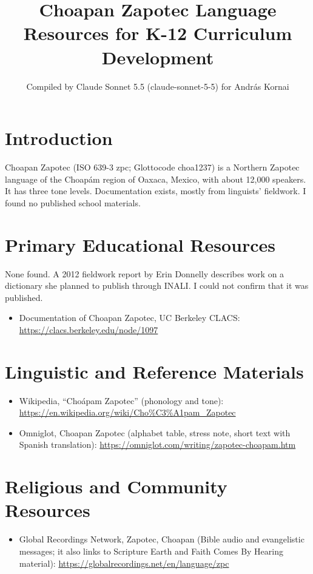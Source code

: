 \documentclass[12pt]{article}
\title{Choapan Zapotec Language Resources for K-12 Curriculum Development}
\author{Compiled by Claude Sonnet 5.5 (claude-sonnet-5-5) for Andr\'as Kornai}
\date{}
\begin{document}
\maketitle

\section{Introduction}
Choapan Zapotec (ISO 639-3 zpc; Glottocode choa1237) is a Northern Zapotec language of the Choap\'am region of Oaxaca, Mexico, with about 12,000 speakers. It has three tone levels. Documentation exists, mostly from linguists' fieldwork. I found no published school materials.

\section{Primary Educational Resources}
None found. A 2012 fieldwork report by Erin Donnelly describes work on a dictionary she planned to publish through INALI. I could not confirm that it was published.
\begin{itemize}
\item Documentation of Choapan Zapotec, UC Berkeley CLACS: \url{https://clacs.berkeley.edu/node/1097}
\end{itemize}

\section{Linguistic and Reference Materials}
\begin{itemize}
\item Wikipedia, ``Cho\'apam Zapotec'' (phonology and tone): \url{https://en.wikipedia.org/wiki/Cho%C3%A1pam_Zapotec}
\item Omniglot, Choapan Zapotec (alphabet table, stress note, short text with Spanish translation): \url{https://omniglot.com/writing/zapotec-choapam.htm}
\end{itemize}

\section{Religious and Community Resources}
\begin{itemize}
\item Global Recordings Network, Zapotec, Choapan (Bible audio and evangelistic messages; it also links to Scripture Earth and Faith Comes By Hearing material): \url{https://globalrecordings.net/en/language/zpc}
\end{itemize}
\end{document}
